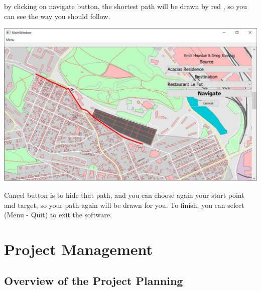 \documentclass[a4paper, 12pt, english]{book}
\begin{document}
by clicking on navigate button, the shortest path will be drawn by red , so you can see the way you should follow.
\begin{center}
\includegraphics[width=.6\textwidth]{GUI_Map2.JPG}
\end{center}
Cancel button is to hide that path, and you can choose again your start point and target, so your path again will be drawn for you.
To finish, you can select (Menu - Quit) to exit the software.

\chapter{Project Management}
\section{Overview of the Project Planning}
\end{document}
